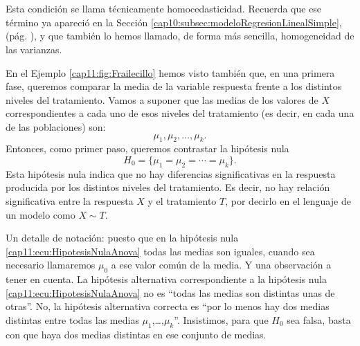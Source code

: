 \paragraph*{}\label{cap11:lugar:homocedasticidad}
        \\[3mm]
Esta condición se llama técnicamente {\sf homocedasticidad}. Recuerda que ese término ya  apareció en la Sección \ref{cap10:subsec:modeloRegresionLinealSimple}, (pág. \pageref{cap10:subsec:modeloRegresionLinealSimple}), y que también lo hemos llamado, de forma más sencilla, {\sf homogeneidad de las varianzas}.

En el Ejemplo \ref{cap11:fig:Frailecillo} hemos visto también que, en una primera fase, queremos comparar la media de la variable respuesta frente a los distintos niveles del tratamiento. Vamos a suponer que las medias de los valores de $X$ correspondientes a cada uno de esos niveles del tratamiento (es decir, en cada una de las poblaciones) son:
    \[\mu_1,\mu_2,\ldots,\mu_k.\]
Entonces, como primer paso, queremos contrastar la hipótesis nula
        \begin{equation}\label{cap11:ecu:HipotesisNulaAnova}
            H_0=\{\mu_1=\mu_2=\cdots=\mu_k\}.
        \end{equation}
Esta hipótesis nula indica que no hay diferencias significativas en la respuesta producida por los distintos niveles del tratamiento. Es decir, no hay relación significativa entre la respuesta $X$ y el tratamiento $T$, por decirlo en el lenguaje de un modelo como $X\sim T$.

Un detalle de notación: puesto que en la hipótesis nula \ref{cap11:ecu:HipotesisNulaAnova} todas las medias son iguales, cuando sea necesario llamaremos $\mu_0$ a ese valor común de la media. Y una observación a tener en cuenta. La hipótesis alternativa correspondiente a la hipótesis nula \ref{cap11:ecu:HipotesisNulaAnova} no es ``todas las medias son distintas unas de otras''. No, la hipótesis alternativa correcta es ``por lo menos hay dos medias distintas entre todas las medias $\mu_1$,\ldots,$\mu_k$''. Insistimos, para que $H_0$ sea falsa, basta con que haya dos medias distintas en ese conjunto de medias.

